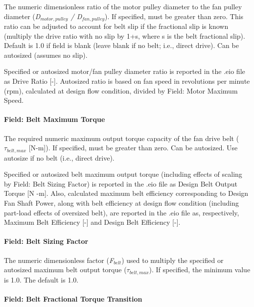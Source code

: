 The numeric dimensionless ratio of the motor pulley diameter to the fan pulley diameter (\emph{D\(_{motor,pulley}\) / D\(_{fan,pulley}\)}). If specified, must be greater than zero. This ratio can be adjusted to account for belt slip if the fractional slip is known (multiply the drive ratio with no slip by 1+s, where s is the belt fractional slip). Default is 1.0 if field is blank (leave blank if no belt; i.e., direct drive). Can be autosized (assumes no slip).

Specified or autosized motor/fan pulley diameter ratio is reported in the .eio file as Drive Ratio {[}-{]}. Autosized ratio is based on fan speed in revolutions per minute (rpm), calculated at design flow condition, divided by Field: Motor Maximum Speed.

\paragraph{Field: Belt Maximum Torque}\label{field-belt-maximum-torque}

The required numeric maximum output torque capacity of the fan drive belt (\(\tau_{belt,max}\) {[}N-m{]}). If specified, must be greater than zero. Can be autosized. Use autosize if no belt (i.e., direct drive).

Specified or autosized belt maximum output torque (including effects of scaling by Field: Belt Sizing Factor) is reported in the .eio file as Design Belt Output Torque {[}N -m{]}. Also, calculated maximum belt efficiency corresponding to Design Fan Shaft Power, along with belt efficiency at design flow condition (including part-load effects of oversized belt), are reported in the .eio file as, respectively, Maximum Belt Efficiency {[}-{]} and Design Belt Efficiency {[}-{]}.

\paragraph{Field: Belt Sizing Factor}\label{field-belt-sizing-factor}

The numeric dimensionless factor (\emph{F\(_{belt}\)}) used to multiply the specified or autosized maximum belt output torque (\(\tau_{belt,max}\)). If specified, the minimum value is 1.0. The default is 1.0.

\paragraph{Field: Belt Fractional Torque Transition}\label{field-belt-fractional-torque-transition}

